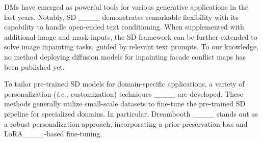 
\gls{DM}s have emerged as powerful tools for various generative applications in the last years. 
Notably, \gls{SD} ____ demonstrates remarkable flexibility with its capability to handle open-ended text conditioning. When supplemented with additional image and mask inputs, the \gls{SD} framework can be further extended to solve image inpainting tasks, guided by relevant text prompts. 
To our knowledge, no method deploying diffusion models for inpainting facade conflict maps has been published yet.

To tailor pre-trained \gls{SD} models for domain-specific applications, a variety of personalization ({\em i.e.,} customization) techniques ____ are developed. These methods generally utilize small-scale datasets to fine-tune the pre-trained \gls{SD} pipeline for specialized domains. In particular, Dreambooth ____ stands out as a robust personalization approach, incorporating a prior-preservation loss and LoRA____-based fine-tuning. 
